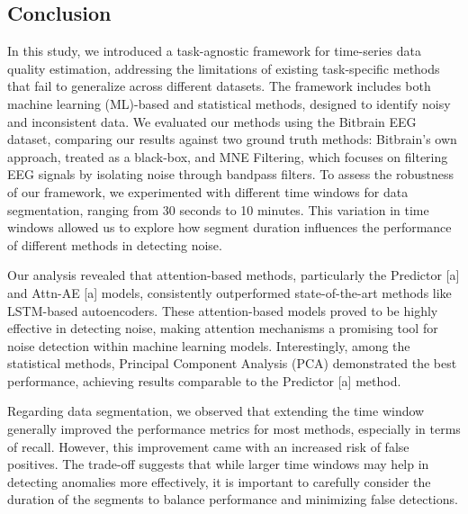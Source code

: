 \subsection{Conclusion}

In this study, we introduced a task-agnostic framework for time-series data quality estimation, addressing the limitations of existing task-specific methods that fail to generalize across different datasets. The framework includes both machine learning (ML)-based and statistical methods, designed to identify noisy and inconsistent data. We evaluated our methods using the Bitbrain EEG dataset, comparing our results against two ground truth methods: Bitbrain's own approach, treated as a black-box, and MNE Filtering, which focuses on filtering EEG signals by isolating noise through bandpass filters. To assess the robustness of our framework, we experimented with different time windows for data segmentation, ranging from 30 seconds to 10 minutes. This variation in time windows allowed us to explore how segment duration influences the performance of different methods in detecting noise.

Our analysis revealed that attention-based methods, particularly the Predictor [a] and Attn-AE [a] models, consistently outperformed state-of-the-art methods like LSTM-based autoencoders. These attention-based models proved to be highly effective in detecting noise, making attention mechanisms a promising tool for noise detection within machine learning models. Interestingly, among the statistical methods, Principal Component Analysis (PCA) demonstrated the best performance, achieving results comparable to the Predictor [a] method.

Regarding data segmentation, we observed that extending the time window generally improved the performance metrics for most methods, especially in terms of recall. However, this improvement came with an increased risk of false positives. The trade-off suggests that while larger time windows may help in detecting anomalies more effectively, it is important to carefully consider the duration of the segments to balance performance and minimizing false detections.
